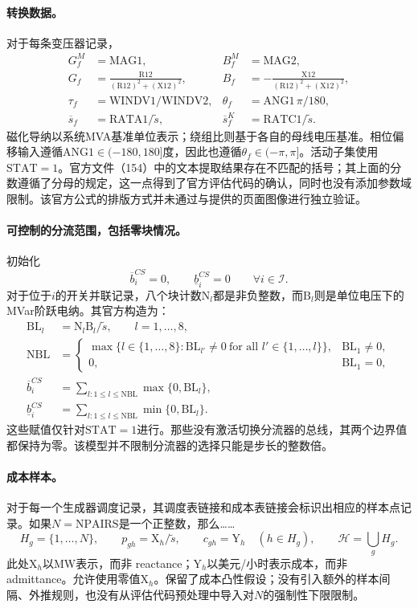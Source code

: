 \documentclass{article}
\begin{document}
\paragraph{转换数据。}
对于每条变压器记录，
\begin{align*}
G_f^M&=\mathrm{MAG1},&B_f^M&=\mathrm{MAG2},\\
G_f&=\frac{\mathrm{R12}}{(\mathrm{R12})^2+(\mathrm{X12})^2},&
B_f&=-\frac{\mathrm{X12}}{(\mathrm{R12})^2+(\mathrm{X12})^2},\\
\tau_f&=\mathrm{WINDV1}/\mathrm{WINDV2},&
\theta_f&=\mathrm{ANG1}\,\pi/180,\\
\overline s_f&=\mathrm{RATA1}/\widetilde s,&
\overline s_f^K&=\mathrm{RATC1}/\widetilde s.
\end{align*}
磁化导纳以系统MVA基准单位表示；绕组比则基于各自的母线电压基准。相位偏移输入遵循$\mathrm{ANG1}\in(-180,180]$度，因此也遵循$\theta_f\in(-\pi,\pi]$。活动子集使用$\mathrm{STAT}=1$。官方文件（154）中的文本提取结果存在不匹配的括号；其上面的分数遵循了分母的规定，这一点得到了官方评估代码的确认，同时也没有添加参数域限制。该官方公式的排版方式并未通过与提供的页面图像进行独立验证。

\paragraph{可控制的分流范围，包括零块情况。}
初始化
\[
\overline b_i^{CS}=0,\qquad\underline b_i^{CS}=0\qquad\forall i\in\mathcal I.
\]
对于位于$i$的开关并联记录，八个块计数$\mathrm N_l$都是非负整数，而$\mathrm B_l$则是单位电压下的MVar阶跃电纳。其官方构造为：
\begin{align*}
\mathrm{BL}_l&=\mathrm N_l\mathrm B_l/\widetilde s,
\qquad l=1,\ldots,8,\\
\mathrm{NBL}&=
\begin{cases}
\max\{l\in\{1,\ldots,8\}:\mathrm{BL}_{l'}\ne0\ \text{for all }l'\in\{1,\ldots,l\}\},&\mathrm{BL}_1\ne0,\\
0,&\mathrm{BL}_1=0,
\end{cases}\\
\overline b_i^{CS}&=\sum_{l:1\leq l\leq\mathrm{NBL}}\max\{0,\mathrm{BL}_l\},\\
\underline b_i^{CS}&=\sum_{l:1\leq l\leq\mathrm{NBL}}\min\{0,\mathrm{BL}_l\}.
\end{align*}
这些赋值仅针对$\mathrm{STAT}=1$进行。那些没有激活切换分流器的总线，其两个边界值都保持为零。该模型并不限制分流器的选择只能是步长的整数倍。

\paragraph{成本样本。}
对于每一个生成器调度记录，其调度表链接和成本表链接会标识出相应的样本点记录。如果$N=\mathrm{NPAIRS}$是一个正整数，那么……
\[
H_g=\{1,\ldots,N\},\qquad
p_{gh}=\mathrm X_h/\widetilde s,\qquad
c_{gh}=\mathrm Y_h\quad(h\in H_g),\qquad
\mathcal H=\bigcup_gH_g.
\]
此处$\mathrm X_h$以MW表示，而非 reactance；$\mathrm Y_h$以美元/小时表示成本，而非 admittance。允许使用零值$\mathrm X_h$。保留了成本凸性假设；没有引入额外的样本间隔、外推规则，也没有从评估代码预处理中导入对$N$的强制性下限限制。
\end{document}
